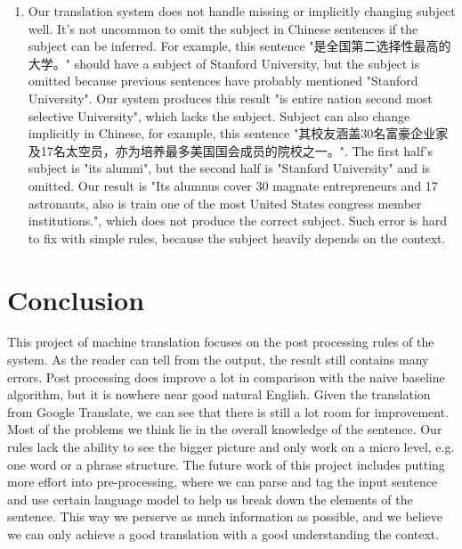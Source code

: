 \documentclass[11pt]{article} %
\begin{document}
\begin{CJK}{UTF8}{gbsn}
\begin{enumerate}
\item Our translation system does not handle missing or implicitly changing subject well. It's not uncommon to omit the subject in Chinese sentences if the subject can be inferred. For example, this sentence "是全国第二选择性最高的大学。" should have a subject of Stanford University, but the subject is omitted because previous sentences have probably mentioned "Stanford University". Our system produces this result "is entire nation second most selective University", which lacks the subject. Subject can also change implicitly in Chinese, for example, this sentence "其校友涵盖30名富豪企业家及17名太空员，亦为培养最多美国国会成员的院校之一。". The first half's subject is "its alumni", but the second half is "Stanford University" and is omitted. Our result is "Its alumnus cover 30 magnate entrepreneurs and 17 astronauts, also is train one of the most United States congress member institutions.", which does not produce the correct subject. Such error is hard to fix with simple rules, because the subject heavily depends on the context. 

\end{enumerate}

\section{Conclusion}
This project of machine translation focuses on the post processing rules of the system. As the reader can tell from the output, the result still contains many errors. Post processing does improve a lot in comparison with the naive baseline algorithm, but it is nowhere near good natural English. Given the translation from Google Translate, we can see that there is still a lot room for improvement. Most of the problems we think lie in the overall knowledge of the sentence. Our rules lack the ability to see the bigger picture and only work on a micro level, e.g. one word or a phrase structure. The future work of this project includes putting more effort into pre-processing, where we can parse and tag the input sentence and use certain language model to help us break down the elements of the sentence. This way we perserve as much information as possible, and we believe we can only achieve a good translation with a good understanding the context.
\end{CJK}
\end{document}
